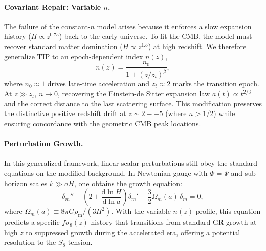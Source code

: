 \documentclass[12pt]{article}
\newcommand{\rhom}{\rho_{\mathrm{m}}}
\newcommand{\dd}{\mathrm{d}}
\begin{document}
\paragraph{Covariant Repair: Variable $n$.}
The failure of the constant-$n$ model arises because it enforces a slow expansion history ($H \propto z^{0.75}$) back to the early universe. To fit the CMB, the model must recover standard matter domination ($H \propto z^{1.5}$) at high redshift.
We therefore generalize TIP to an epoch-dependent index $n(z)$,
\begin{equation}
n(z) = \frac{n_0}{1 + (z/z_t)^\beta},
\label{eq:variable_n}
\end{equation}
where $n_0 \approx 1$ drives late-time acceleration and $z_t \approx 2$ marks the transition epoch.
At $z \gg z_t$, $n \to 0$, recovering the Einstein-de Sitter expansion law $a(t) \propto t^{2/3}$ and the correct distance to the last scattering surface.
This modification preserves the distinctive positive redshift drift at $z \sim 2--5$ (where $n > 1/2$) while ensuring concordance with the geometric CMB peak locations.

\paragraph{Perturbation Growth.}
In this generalized framework, linear scalar perturbations still obey the standard equations on the modified background. In Newtonian gauge with $\Phi=\Psi$ and sub-horizon scales $k\gg aH$, one obtains the growth equation:
\begin{equation}
\delta_{m}''+\left(2+\frac{\dd\ln H}{\dd\ln a}\right)\delta_{m}'-\frac{3}{2}\Omega_{m}(a)\,\delta_{m}=0,
\label{eq:growth_lna}
\end{equation}
where $\Omega_{m}(a)\equiv 8\pi G\rhom / (3H^{2})$. With the variable $n(z)$ profile, this equation predicts a specific $f\sigma_8(z)$ history that transitions from standard GR growth at high $z$ to suppressed growth during the accelerated era, offering a potential resolution to the $S_8$ tension.
\end{document}
